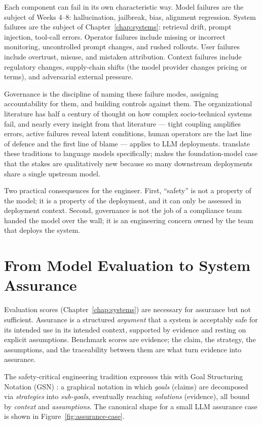 Each component can fail in its own characteristic way. Model
failures are the subject of Weeks 4--8: hallucination,
jailbreak, bias, alignment regression. System failures are the
subject of Chapter~\ref{chap:systems}: retrieval drift, prompt injection, tool-call
errors. Operator failures include missing or incorrect
monitoring, uncontrolled prompt changes, and rushed rollouts.
User failures include overtrust, misuse, and mistaken
attribution. Context failures include regulatory changes,
supply-chain shifts (the model provider changes pricing or
terms), and adversarial external pressure.

Governance is the discipline of naming these failure modes,
assigning accountability for them, and building controls against
them. The organizational literature
\citep{perrow1999normal, reason1990human} has half a century of
thought on how complex socio-technical systems fail, and nearly
every insight from that literature --- tight coupling amplifies
errors, active failures reveal latent conditions, human
operators are the last line of defence and the first line of
blame --- applies to LLM deployments. \citet{weidinger2021ethical,
weidinger2023sociotechnical} translate these traditions to
language models specifically; \citet{bommasani2021opportunities}
makes the foundation-model case that the stakes are
qualitatively new because so many downstream deployments share a
single upstream model.

Two practical consequences for the engineer. First, ``safety'' is
not a property of the model; it is a property of the deployment,
and it can only be assessed in deployment context. Second,
governance is not the job of a compliance team handed the model
over the wall; it is an engineering concern owned by the team
that deploys the system.

\section{From Model Evaluation to System Assurance}

Evaluation scores (Chapter~\ref{chap:systems}) are necessary for assurance but not
sufficient. Assurance is a structured \emph{argument} that a
system is acceptably safe for its intended use in its intended
context, supported by evidence and resting on explicit
assumptions. Benchmark scores are evidence; the claim, the
strategy, the assumptions, and the traceability between them are
what turn evidence into assurance.

The safety-critical engineering tradition
\citep{leveson2011engineering} expresses this with
Goal Structuring Notation (GSN) \citep{gsn2021}: a graphical
notation in which \emph{goals} (claims) are decomposed via
\emph{strategies} into \emph{sub-goals}, eventually reaching
\emph{solutions} (evidence), all bound by \emph{context} and
\emph{assumptions}. The canonical shape for a small LLM assurance
case is shown in Figure~\ref{fig:assurance-case}.

